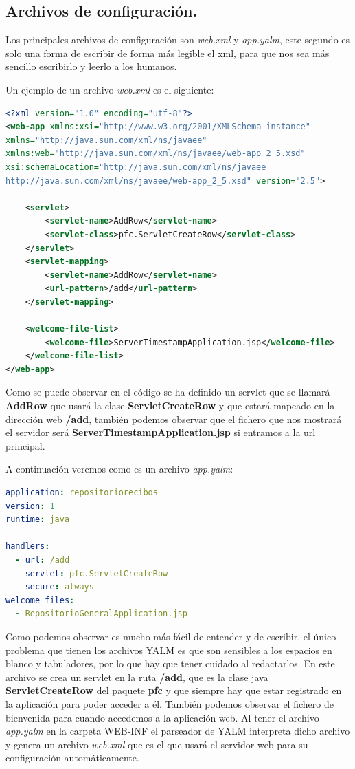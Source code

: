 \subsection{Archivos de configuración.\label{ref_archivos_configuracion_google_app_engine}}
Los principales archivos de configuración son \textit{web.xml} y \textit{app.yalm}, este segundo es solo una forma de escribir de forma más legible el xml, para que nos sea más sencillo escribirlo y leerlo a los humanos.

Un ejemplo de un archivo \textit{web.xml} es el siguiente:

\begin{lstlisting}[language=XML]
<?xml version="1.0" encoding="utf-8"?>
<web-app xmlns:xsi="http://www.w3.org/2001/XMLSchema-instance"
xmlns="http://java.sun.com/xml/ns/javaee"
xmlns:web="http://java.sun.com/xml/ns/javaee/web-app_2_5.xsd"
xsi:schemaLocation="http://java.sun.com/xml/ns/javaee
http://java.sun.com/xml/ns/javaee/web-app_2_5.xsd" version="2.5">

	<servlet>
		<servlet-name>AddRow</servlet-name>
		<servlet-class>pfc.ServletCreateRow</servlet-class>
	</servlet>
	<servlet-mapping>
		<servlet-name>AddRow</servlet-name>
		<url-pattern>/add</url-pattern>
	</servlet-mapping>

	<welcome-file-list>
		<welcome-file>ServerTimestampApplication.jsp</welcome-file>
	</welcome-file-list>
</web-app>
\end{lstlisting}
Como se puede observar en el código se ha definido un servlet que se llamará \textbf{AddRow} que usará la clase \textbf{ServletCreateRow} y que estará mapeado en la dirección web \textbf{/add}, también podemos observar que el fichero que nos mostrará el servidor será \textbf{ServerTimestampApplication.jsp} si entramos a la url principal.

A continuación veremos como es un archivo \textit{app.yalm}:
\begin{lstlisting}[language=YAML]
application: repositoriorecibos
version: 1
runtime: java

handlers:
  - url: /add
    servlet: pfc.ServletCreateRow
    secure: always
welcome_files:
  - RepositorioGeneralApplication.jsp
\end{lstlisting}

Como podemos observar es mucho más fácil de entender y de escribir, el único problema que tienen los archivos YALM es que son sensibles a los espacios en blanco y tabuladores, por lo que hay que tener cuidado al redactarlos. En este archivo se crea un servlet en la ruta \textbf{/add}, que es la clase java \textbf{ServletCreateRow} del paquete \textbf{pfc} y que siempre hay que estar registrado en la aplicación para poder acceder a él. También podemos observar el fichero de bienvenida para cuando accedemos a la aplicación web. 
Al tener el archivo \textit{app.yalm} en la carpeta WEB-INF el parseador de YALM interpreta dicho archivo y genera un archivo \textit{web.xml} que es el que usará el servidor web para su configuración automáticamente.

